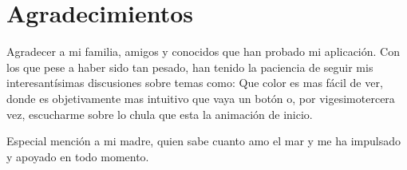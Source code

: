 \chapter*{Agradecimientos}

Agradecer a mi familia, amigos y conocidos que han probado mi aplicación. Con los que pese a haber sido tan pesado,
han tenido la paciencia de seguir mis interesantísimas discusiones sobre temas como: Que color es mas fácil de ver, donde es objetivamente mas intuitivo 
que vaya un botón o, por vigesimotercera vez, escucharme sobre lo chula que esta la animación de inicio.

Especial mención a mi madre, quien sabe cuanto amo el mar y me ha impulsado y apoyado en todo momento.